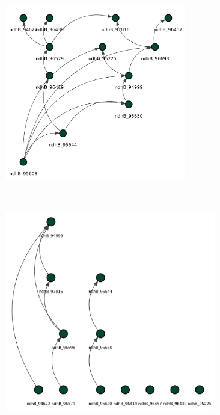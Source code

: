 \documentclass[
]{article}
\theoremstyle{definition}
\theoremstyle{remark}
\begin{document}
\begin{figure}[H]

\begin{minipage}{0.43\linewidth}

\includegraphics[width=3.125in,height=\textheight,keepaspectratio]{Figures Causal Discovery/DAG_HC_ndhB.png}

\end{minipage}%
%
\begin{minipage}{0.13\linewidth}
~\end{minipage}%
%
\begin{minipage}{0.43\linewidth}

\includegraphics[width=3.64583in,height=\textheight,keepaspectratio]{Figures Causal Discovery/DAG_PC_ndhB.png}

\end{minipage}%
\newline
\begin{minipage}{0.43\linewidth}


\end{minipage}
\end{figure}
\end{document}
